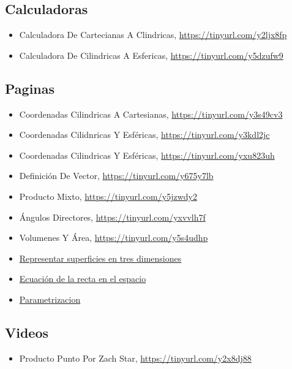 \documentclass{article}
\begin{document}
\subsection{Calculadoras}
\label{sec:orgab1c2cc}
\begin{itemize}
\item Calculadora De Cartecianas A Clindricas, \url{https://tinyurl.com/y2ljx8fp}
\item Calculadora De Cilindricas A Esfericas, \url{https://tinyurl.com/y5dzufw9}
\end{itemize}

\subsection{Paginas}
\label{sec:org7bf05ae}
\begin{itemize}
\item Coordenadas Cilindricas A Cartesianas, \url{https://tinyurl.com/y3s49cv3}
\item Coordenadas Cilidnricas Y Esféricas, \url{https://tinyurl.com/y3kdl2jc}
\item Coordenadas Cilindricas Y Esféricas, \url{https://tinyurl.com/yxu823uh}
\item Definición De Vector, \url{https://tinyurl.com/y675y7lb}
\item Producto Mixto, \url{https://tinyurl.com/y5jzwdy2}
\item Ángulos Directores, \url{https://tinyurl.com/yxvvlh7f}
\item Volumenes Y Área, \url{https://tinyurl.com/y5s4udhp}
\item \href{https://www.gaussianos.com/representar-superficies-en-tres-dimensiones/}{Representar superficies en tres dimensiones}
\item \href{https://www.superprof.es/apuntes/escolar/matematicas/analitica/recta/ecuaciones-de-la-recta-en-el-espacio.html\#tema\_ecuacion-continua-de-la-recta}{Ecuación de la recta en el espacio}

\item \href{https://personales.unican.es/alvareze/CalculoWeb/CalculoII/apuntes/curvasParametricas.pdf}{Parametrizacion}
\end{itemize}

\subsection{Videos}
\label{sec:org6e15cb8}
\begin{itemize}
\item Producto Punto Por Zach Star, \url{https://tinyurl.com/y2x8dj88}
\end{itemize}
\end{document}
